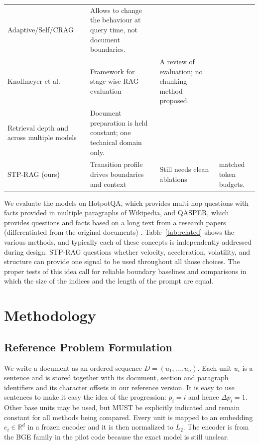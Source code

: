 \documentclass[10pt,a4paper]{article}
\begin{document}
\begin{table}[!htbp]
\begin{tabularx}{\textwidth}{@{}>{\raggedright\arraybackslash}p{}>{\raggedright\arraybackslash}p{}>{\raggedright\arraybackslash}p{}>{\raggedright\arraybackslash}X@{}}
Adaptive/Self/CRAG \cite{jeong2024adaptiverag,asai2024selfrag,yan2024crag} & Allows to change the behaviour at query time, not document boundaries. & & \\
Knollmeyer et al. \cite{knollmeyer2026evaluation} & Framework for stage-wise RAG evaluation & A review of evaluation; no chunking method proposed. & \\
Retrieval depth and across multiple models & Document preparation is held constant; one technical domain only. & & \\
STP-RAG (ours) & Transition profile drives boundaries and context & Still needs clean ablations & matched token budgets. \\
\bottomrule
\end{tabularx}
\end{table}

We evaluate the models on HotpotQA, which provides multi-hop questions with facts provided in multiple paragraphs of Wikipedia, and QASPER, which provides questions and facts based on a long text from a research papers (differentiated from the original documents) \parencite{yang2018hotpotqa,dasigi2021qasper}. Table~\ref{tab:related} shows the various methods, and typically each of these concepts is independently addressed during design. STP-RAG questions whether velocity, acceleration, volatility, and structure can provide one signal to be used throughout all those choices. The proper tests of this idea call for reliable boundary baselines and comparisons in which the size of the indices and the length of the prompt are equal.

\FloatBarrier
\section{Methodology}
\label{sec:method}

\subsection{Reference Problem Formulation}

We write a document as an ordered sequence $D=(u_1,\ldots,u_n)$. Each unit $u_i$ is a sentence and is stored together with its document, section and paragraph identifiers and its character offsets in our reference version. It is easy to use sentences to make it easy the idea of the progression: $p_i=i$ and hence $\Delta p_i=1$. Other base units may be used, but MUST be explicitly indicated and remain constant for all methods being compared. Every unit is mapped to an embedding $e_i\in\mathbb{R}^d$ in a frozen encoder and it is then normalized to $L_2$. The encoder is from the BGE family in the pilot code \cite{xiao2023cpack,chen2024bgem3} because the exact model is still unclear.
\end{document}
